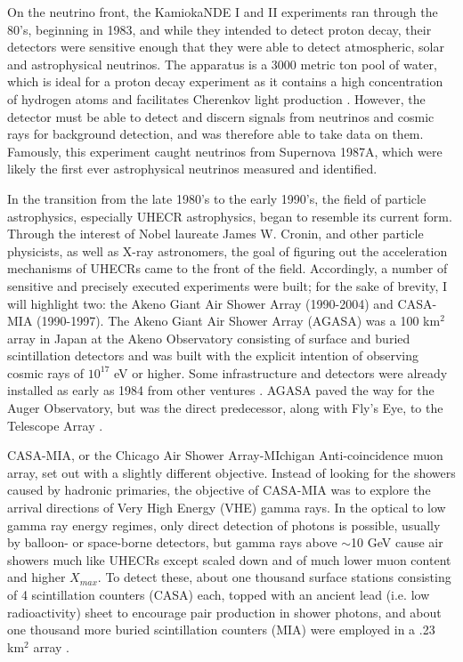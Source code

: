 On the neutrino front, the KamiokaNDE I and II experiments ran through the 80's, beginning in 1983, and while they intended to detect proton decay, their detectors were sensitive enough that they were able to detect atmospheric, solar and astrophysical neutrinos. The apparatus is a 3000 metric ton pool of water, which is ideal for a proton decay experiment as it contains a high concentration of hydrogen atoms and facilitates Cherenkov light production \cite{kamiokande}. However, the detector must be able to detect and discern signals from neutrinos and cosmic rays for background detection, and was therefore able to take data on them.
Famously, this experiment caught neutrinos from Supernova 1987A, which were likely the first ever astrophysical neutrinos measured and identified. 

In the transition from the late 1980's to the early 1990's, the field of particle astrophysics, especially UHECR astrophysics, began to resemble its current form. Through the interest of Nobel laureate James W. Cronin, and other particle physicists, as well as X-ray astronomers, the goal of figuring out the acceleration mechanisms of UHECRs came to the front of the field. Accordingly, a number of sensitive and precisely executed experiments were built; for the sake of brevity, I will highlight two: the Akeno Giant Air Shower Array (1990-2004) and CASA-MIA (1990-1997). The Akeno Giant Air Shower Array (AGASA) was a 100 km$^2$ array in Japan at the Akeno Observatory consisting of surface and buried scintillation detectors and was built with the explicit intention of observing cosmic rays of $10^{17}$ eV or higher. Some infrastructure and detectors were already installed as early as 1984 from other ventures \cite{agasa}. AGASA paved the way for the Auger Observatory, but was the direct predecessor, along with Fly's Eye, to the Telescope Array \cite{ultraray}. 

CASA-MIA, or the Chicago Air Shower Array-MIchigan Anti-coincidence muon array, set out with a slightly different objective. Instead of looking for the showers caused by hadronic primaries, the objective of CASA-MIA was to explore the arrival directions of Very High Energy (VHE) gamma rays. In the optical to low gamma ray energy regimes, only direct detection of photons is possible, usually by balloon- or space-borne detectors, but gamma rays above $\sim$10 GeV cause air showers much like UHECRs except scaled down and of much lower muon content and higher $X_{max}$. To detect these, about one thousand surface stations consisting of 4 scintillation counters (CASA) each, topped with an ancient lead (i.e. low radioactivity) sheet to encourage pair production in shower photons, and about one thousand more buried scintillation counters (MIA) were employed in a .23 km$^2$ array \cite{casamia}. 

